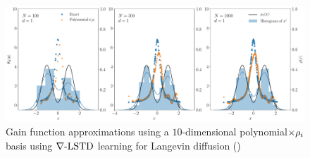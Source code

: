 \begin{figure}
	\includegraphics[width=6in]{images/Chap4_lang_td_wt_polynomials}
	\caption[Finite dimensional polynomial basis]{Gain function approximations using a $10$-dimensional polynomial$\times \rho_i$ basis using $\nabla\text{-LSTD}$ learning for Langevin diffusion ()}
	\label{fig:diff_td_lang_linear}
\end{figure}

